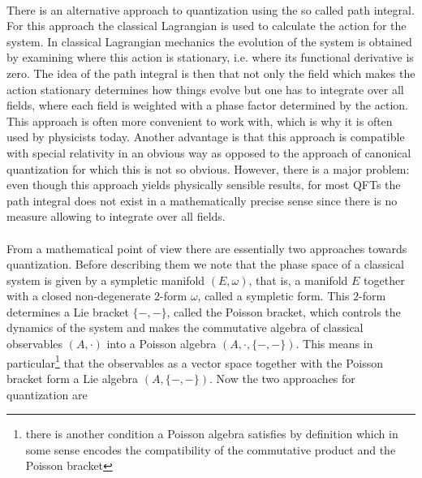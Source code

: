 \\
There is an alternative approach to quantization using the so called path integral. For this approach the classical Lagrangian is used to calculate the action for the system. In classical Lagrangian mechanics the evolution of the system is obtained by examining where this action is stationary, i.e. where its functional derivative is zero. The idea of the path integral is then that not only the field which makes the action stationary determines how things evolve but one has to integrate over all fields, where each field is weighted with a phase factor determined by the action. This approach is often more convenient to work with, which is why it is often used by physicists today. Another advantage is that this approach is compatible with special relativity in an obvious way as opposed to the approach of canonical quantization for which this is not so obvious. However, there is a major problem: even though this approach yields physically sensible results, for most QFTs the path integral does not exist in a mathematically precise sense since there is no measure allowing to integrate over all fields.
\\\\
From a mathematical point of view there are essentially two approaches towards quantization. Before describing them we note that the phase space of a classical system is given by a sympletic manifold $(E,\omega)$, that is, a manifold $E$ together with a closed non-degenerate $2$-form $\omega$, called a sympletic form. This $2$-form determines a Lie bracket $\lbrace -,- \rbrace$, called the Poisson bracket, which controls the dynamics of the system and makes the commutative algebra of classical observables $(A,\cdot)$ into a Poisson algebra $(A,\cdot,\lbrace -,- \rbrace)$. This means in particular\footnote{there is another condition a Poisson algebra satisfies by definition which in some sense encodes the compatibility of the commutative product and the Poisson bracket} that the observables as a vector space together with the Poisson bracket form a Lie algebra $(A,\lbrace - ,- \rbrace)$. Now the two approaches for quantization are
